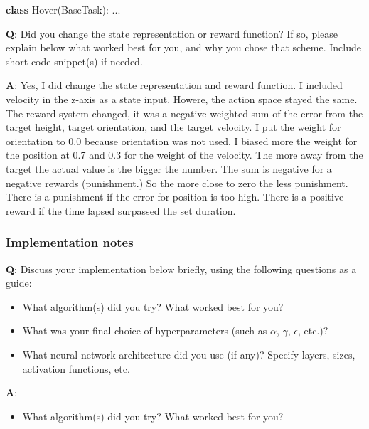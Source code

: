 \documentclass[11pt]{article}
\providecommand{\tightlist}{%
      \setlength{\itemsep}{0pt}\setlength{\parskip}{0pt}}
\newenvironment{Shaded}{}{}
\newcommand{\KeywordTok}[1]{\textcolor[rgb]{0.00,0.44,0.13}{\textbf{{#1}}}}
\newcommand{\NormalTok}[1]{{#1}}
\begin{document}
\begin{Shaded}
\begin{Highlighting}[]
\KeywordTok{class}\NormalTok{ Hover(BaseTask):}
\NormalTok{    ...}
\end{Highlighting}
\end{Shaded}

\textbf{Q}: Did you change the state representation or reward function?
If so, please explain below what worked best for you, and why you chose
that scheme. Include short code snippet(s) if needed.

\textbf{A}: Yes, I did change the state representation and reward
function. I included velocity in the z-axis as a state input. Howere,
the action space stayed the same. The reward system changed, it was a
negative weighted sum of the error from the target height, target
orientation, and the target velocity. I put the weight for orientation
to 0.0 because orientation was not used. I biased more the weight for
the position at 0.7 and 0.3 for the weight of the velocity. The more
away from the target the actual value is the bigger the number. The sum
is negative for a negative rewards (punishment.) So the more close to
zero the less punishment. There is a punishment if the error for
position is too high. There is a positive reward if the time lapsed
surpassed the set duration.

\subsubsection{Implementation notes}\label{implementation-notes}

\textbf{Q}: Discuss your implementation below briefly, using the
following questions as a guide:

\begin{itemize}
\tightlist
\item
  What algorithm(s) did you try? What worked best for you?
\item
  What was your final choice of hyperparameters (such as \(\alpha\),
  \(\gamma\), \(\epsilon\), etc.)?
\item
  What neural network architecture did you use (if any)? Specify layers,
  sizes, activation functions, etc.
\end{itemize}

\textbf{A}:

\begin{itemize}
\tightlist
\item
  What algorithm(s) did you try? What worked best for you?
\end{itemize}
\end{document}
